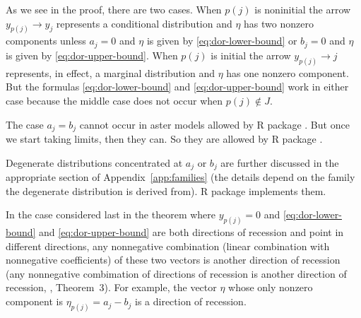 As we see in the proof, there are two cases.  When $p(j)$ is noninitial
the arrow $y_{p(j)} \longrightarrow y_j$ represents a conditional
distribution and $\eta$ has two nonzero components unless $a_j = 0$ and
$\eta$ is given by \eqref{eq:dor-lower-bound} or $b_j = 0$ and
$\eta$ is given by \eqref{eq:dor-upper-bound}.
When $p(j)$ is initial the arrow $y_{p(j)} \longrightarrow j$ represents,
in effect, a marginal distribution and $\eta$ has one nonzero component.
But the formulas \eqref{eq:dor-lower-bound} and \eqref{eq:dor-upper-bound}
work in either case because the middle case does not occur when
$p(j) \notin J$.

The case $a_j = b_j$ cannot occur in aster models allowed
by R package .  But once we start
taking limits, then they can.  So they are allowed by R package .

Degenerate distributions concentrated at $a_j$ or $b_j$ are further
discussed in the appropriate section of Appendix~\ref{app:families}
(the details depend on the family the degenerate distribution is derived
from).
R package  implements them.

In the case considered last in the theorem where $y_{p(j)} = 0$ and
\eqref{eq:dor-lower-bound} and \eqref{eq:dor-upper-bound} are both
directions of recession and point in different directions, any nonnegative
combination (linear combination with nonnegative coefficients) of these
two vectors is another direction of recession (any nonnegative combimation
of directions of recession is another direction of recession,
\citealp{geyer-gdor}, Theorem~3).  For example, the vector $\eta$ whose
only nonzero component is $\eta_{p(j)} = a_j - b_j$ is a direction
of recession.


